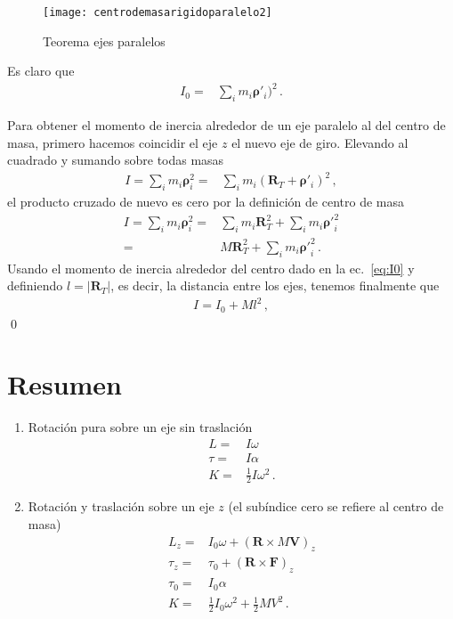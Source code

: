 \begin{frame}
\begin{figure}
  \centering
{\texttt{[image: centrodemasarigidoparalelo2]}}
  \caption{Teorema ejes paralelos}
  \label{fig:centrodemasarigidoparalelo}
\end{figure}
\end{frame}

Es claro que
\begin{align}
\label{eq:I0}
  I_0=&\sum_i m_i\boldsymbol{\rho}'_i)^2\,.
\end{align}

Para obtener el momento de inercia alrededor de un eje paralelo al del centro de masa, primero hacemos coincidir el eje $z$ el nuevo eje de giro. Elevando al cuadrado y sumando sobre todas masas  
\begin{align}
  I=\sum_i m_i\boldsymbol{\rho}_i^2=&\sum_i m_i(\mathbf{R}_T+\boldsymbol{\rho}'_i)^2\,,
\end{align}
el producto cruzado de nuevo es cero por la definición de centro de masa
\begin{align}
  I=\sum_i m_i\boldsymbol{\rho}_i^2=&\sum_i m_i\mathbf{R}_T^2+\sum_i m_i{\boldsymbol{\rho}'}_i^2\nonumber\\
  =&M\mathbf{R}_T^2+\sum_i m_i{\boldsymbol{\rho}'}_i^2\,.
\end{align}
Usando el momento de  inercia alrededor del centro dado en la ec.~\eqref{eq:I0}
y definiendo  $l=\left|\mathbf{R}_T\right|$, es decir, la distancia entre los ejes, tenemos finalmente que
\begin{align}
  I=I_0+M l^2\,,
\end{align}
\qed


\section{Resumen}
\begin{enumerate}
\item Rotación pura sobre un eje sin traslación
  \begin{align}
    L=&I\omega\nonumber\\
    \tau=&I\alpha\nonumber\\
    K=&\tfrac{1}{2}I\omega^2\,.
  \end{align}
\item Rotación y traslación sobre un eje $z$ (el subíndice cero se refiere al centro de masa)
  \begin{align}
    L_z=&I_0\omega+(\mathbf{R}\times M\mathbf{V})_z\nonumber\\
    \tau_z=&\tau_0+(\mathbf{R}\times\mathbf{F})_z\nonumber\\
    \tau_0=&I_0\alpha\nonumber\\
    K=&\tfrac{1}{2}I_0\omega^2+\tfrac{1}{2}M V^2\,.
  \end{align}


\end{enumerate}


